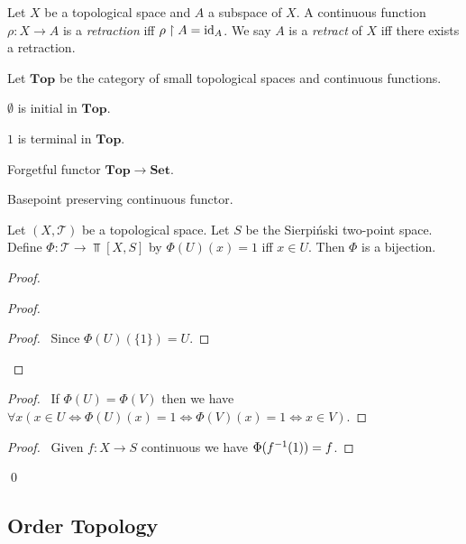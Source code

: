 \begin{df}[Retraction]
Let $X$ be a topological space and $A$ a subspace of $X$. A continuous function $\rho : X \rightarrow A$ is a \emph{retraction} iff $\rho \restriction A = \mathrm{id}_{A}$. We say $A$ is a \emph{retract} of $X$ iff there exists a retraction.
\end{df}

\begin{df}
Let $\mathbf{Top}$ be the category of small topological spaces and continuous functions.
\end{df}

\begin{prop}
$\emptyset$ is initial in $\mathbf{Top}$.
\end{prop}

\begin{prop}
$1$ is terminal in $\mathbf{Top}$.
\end{prop}

Forgetful functor $\mathbf{Top} \rightarrow \mathbf{Set}$.

Basepoint preserving continuous functor.

\begin{prop}
Let $(X, \mathcal{T})$ be a topological space. Let $S$ be the Sierpi\'{n}ski two-point space. Define $\Phi : \mathcal{T} \rightarrow \Top[X,S]$ by $\Phi(U)(x) = 1$ iff $x \in U$. Then $\Phi$ is a bijection.
\end{prop}

\begin{proof}
\pf
{}
\begin{proof}
	\begin{proof}
		\pf\ Since $\Phi(U)(\{1\}) = U$.
	\end{proof}
\end{proof}
\begin{proof}
	\pf\ If $\Phi(U) = \Phi(V)$ then we have $\forall x (x \in U \Leftrightarrow \Phi(U)(x) = 1 \Leftrightarrow \Phi(V)(x) = 1 \Leftrightarrow x \in V)$.
\end{proof}
\begin{proof}
	\pf\ Given $f : X \rightarrow S$ continuous we have $\Phi({f}^{-1}(1)) = f$.
\end{proof}
\qed
\end{proof}

\subsection{Order Topology}

